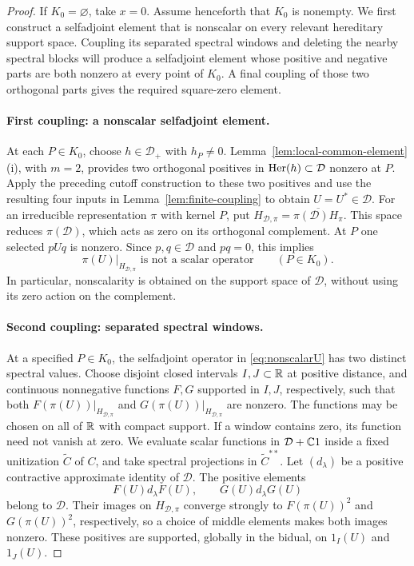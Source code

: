 \begin{proof}
If $K_0=\varnothing$, take $x=0$.  Assume henceforth that $K_0$
is nonempty.  We first construct a selfadjoint element that is
nonscalar on every relevant hereditary support space.  Coupling its
separated spectral windows and deleting the nearby spectral blocks
will produce a selfadjoint element whose positive and negative parts
are both nonzero at every point of $K_0$.  A final coupling of those
two orthogonal parts gives the required square-zero element.

\paragraph{First coupling: a nonscalar selfadjoint element.}
At each $P\in K_0$, choose $h\in\mathcal D_+$ with $h_P\ne0$.
Lemma~\ref{lem:local-common-element}\textup{(i)}, with $m=2$,
provides two orthogonal positives in $\operatorname{Her}(h)\subset\mathcal D$
nonzero at $P$.  Apply the preceding cutoff construction to these
two positives and use the resulting four inputs in
Lemma~\ref{lem:finite-coupling} to obtain $U=U^*\in\mathcal D$.
For an irreducible representation $\pi$ with kernel $P$, put
$H_{\mathcal D,\pi}=\overline{\pi(\mathcal D)H_\pi}$.
This space reduces $\pi(\mathcal D)$, which acts as zero on its
orthogonal complement.  At $P$ one selected $pUq$ is nonzero.
Since $p,q\in\mathcal D$ and $pq=0$, this implies
\begin{equation}\label{eq:nonscalarU}
 \pi(U)|_{H_{\mathcal D,\pi}}\text{ is not a scalar operator}
 \qquad(P\in K_0).
\end{equation}
In particular, nonscalarity is obtained on the support space of
$\mathcal D$, without using its zero action on the complement.

\paragraph{Second coupling: separated spectral windows.}
At a specified $P\in K_0$, the selfadjoint operator in
\eqref{eq:nonscalarU} has two distinct spectral values.  Choose
disjoint closed intervals $I,J\subset\mathbb R$ at positive distance,
and continuous nonnegative functions $F,G$ supported in $I,J$,
respectively, such that both
$F(\pi(U))|_{H_{\mathcal D,\pi}}$ and
$G(\pi(U))|_{H_{\mathcal D,\pi}}$ are nonzero.
The functions may be chosen on all of $\mathbb R$ with compact support.
If a window contains zero, its function need not vanish at zero.
We evaluate scalar functions in $\mathcal D+\mathbb C1$ inside a fixed
unitization $\widetilde C$ of $C$, and take spectral projections in
$\widetilde C^{**}$.
Let $(d_\lambda)$ be a positive contractive approximate identity of
$\mathcal D$.
The positive elements
\[
 F(U)d_\lambda F(U),\qquad G(U)d_\lambda G(U)
\]
belong to $\mathcal D$.  Their images on
$H_{\mathcal D,\pi}$ converge strongly to $F(\pi(U))^2$ and
$G(\pi(U))^2$, respectively, so a choice of middle elements makes
both images nonzero.  These positives are supported, globally in
the bidual, on $1_I(U)$ and $1_J(U)$.


\end{proof}
